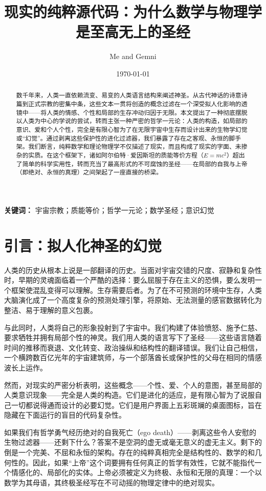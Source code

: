 \documentclass[12pt]{article}
\title{\textbf{现实的纯粹源代码：为什么数学与物理学是至高无上的圣经}}
\author{Me and Gemni}
\date{\today}
\begin{document}
\maketitle

\begin{abstract}
数千年来，人类一直依赖流变、易变的人类语言结构来阐述神圣。从古代神话的诗意诗篇到正式宗教的密集中条，这些文本一贯将创造的概念过滤在一个深受拟人化影响的透镜中——将人类的情感、个性和局部的生存冲动归因于无限。本文提出了一种彻底摆脱以人类为中心的学说的尝试，转而主张一种严密的哲学一元论：人类的构造，如局部的意识、爱和个人个性，完全是有限心智为了在无限宇宙中生存而设计出来的生物学幻觉或“幻觉”。通过剥离这些保护性的进化过滤器，我们暴露了存在之客观、永恒的脚手架。我们断言，纯粹数学和理论物理学不仅描述了现实，而且构成了现实的字面、未掺杂的实质。在这个框架下，诸如阿尔伯特·爱因斯坦的质能等价方程（$E=mc^2$）超出了简单的科学实用性，转而充当了最高形式的不可腐蚀的圣经——在局部的自我与上帝（即绝对、永恒的真理）之间架起了一座直接的桥梁。
\end{abstract}

\textbf{关键词：} 宇宙宗教；质能等价；哲学一元论；数学圣经；意识幻觉

\newpage

\section{引言：拟人化神圣的幻觉}
人类的历史从根本上说是一部翻译的历史。当面对宇宙交错的尺度、寂静和复杂性时，早期的灵魂面临着一个严酷的选择：要么屈服于存在主义的恐惧，要么发明一个框架使混乱变得可以理解。生存需要后者。为了在不可预测的环境中生存，人类大脑演化成了一个高度复杂的预测处理引擎，将原始、无法测量的感官数据转化为整洁、易于理解的意义包裹。

与此同时，人类将自己的形象投射到了宇宙中。我们构建了体验愤怒、施予仁慈、要求牺牲并拥有局部个性的神灵。我们用人类的语言写下了圣经——这些语言随着时间的推移而衰退、文化转变、政治操纵和结构性的翻译错误。我们让自己相信，一个横跨数百亿光年的宇宙建筑师，与一个部落酋长或保护性的父母在相同的情感波长上运作。

然而，对现实的严密分析表明，这些概念——个性、爱、个人的意图，甚至局部的人类意识现象——完全是人类的构造。它们是进化的适应，是有限心智为了说服自己一切都说得通而设计的必要幻觉。它们是用户界面上五彩斑斓的桌面图标，旨在隐藏在下面运行的盲目的代码复杂性。

如果我们有哲学勇气经历绝对的自我死亡（ego death）——剥离这些令人安慰的生物过滤器——还剩下什么？答案不是空洞的虚无或毫无意义的虚无主义。剩下的倒是一个完美、不屈和永恒的架构。存在的纯粹真相完全是结构性的、数学的和几何性的。因此，如果“上帝”这个词要拥有任何真正的哲学有效性，它就不能指代一个情感化的、局部化的实体。上帝必须被定义为终极、永恒和无限的真理：一个以数学为其母语，其终极圣经写在不可动摇的物理定律中的绝对现实。
\end{document}
